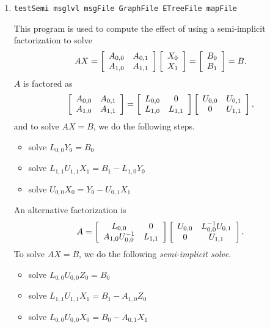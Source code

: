 \begin{enumerate}
\item
\begin{verbatim}
testSemi msglvl msgFile GraphFile ETreeFile mapFile
\end{verbatim}
This program is used to compute the effect of using a semi-implicit
factorization to solve 
$$
AX = 
\left \lbrack \begin{array}{cc}
A_{0,0} & A_{0,1} \cr
A_{1,0} & A_{1,1} 
\end{array} \right \rbrack
\left \lbrack \begin{array}{c}
X_0 \cr
X_1 
\end{array} \right \rbrack
=
\left \lbrack \begin{array}{c}
B_0 \cr
B_1 
\end{array} \right \rbrack
= B.
$$
$A$ is factored as
$$
\left \lbrack \begin{array}{cc}
A_{0,0} & A_{0,1} \cr
A_{1,0} & A_{1,1} 
\end{array} \right \rbrack
=
\left \lbrack \begin{array}{cc}
L_{0,0} & 0 \cr
L_{1,0} & L_{1,1} 
\end{array} \right \rbrack
\left \lbrack \begin{array}{cc}
U_{0,0} & U_{0,1} \cr
 0 & U_{1,1} 
\end{array} \right \rbrack,
$$
and to solve $AX = B$, we do the following steps.
\begin{itemize}
\item solve $L_{0,0} Y_0 = B_0$
\item solve $L_{1,1} U_{1,1} X_1 = B_1 - L_{1,0} Y_0$
\item solve $U_{0,0} X_0 = Y_0 - U_{0,1} X_1$
\end{itemize}
An alternative factorization is
$$
A =
\left \lbrack \begin{array}{cc}
L_{0,0} & 0 \cr
A_{1,0}U_{0,0}^{-1} & L_{1,1} 
\end{array} \right \rbrack
\left \lbrack \begin{array}{cc}
U_{0,0} & L_{0,0}^{-1}U_{0,1} \cr
 0 & U_{1,1} 
\end{array} \right \rbrack.
$$
To solve $AX = B$, we do the following {\it semi-implicit solve}.
\begin{itemize}
\item solve $L_{0,0} U_{0,0} Z_0 = B_0$
\item solve $L_{1,1} U_{1,1} X_1 = B_1 - A_{1,0} Z_0$
\item solve $L_{0,0} U_{0,0} X_0 = B_0 - A_{0,1} X_1$

\end{itemize}
\end{enumerate}
